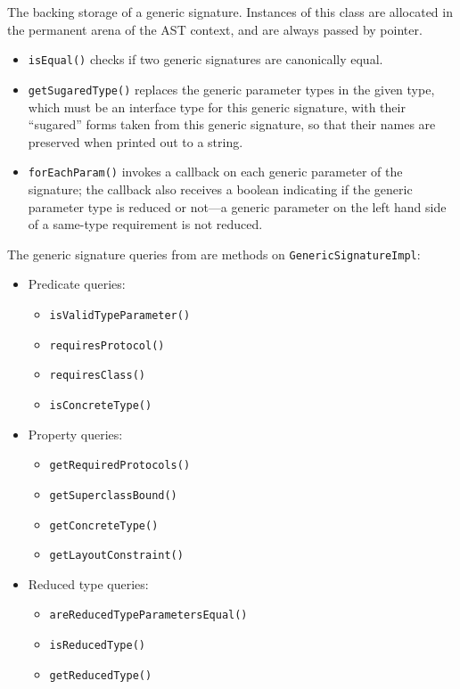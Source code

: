 \documentclass[../generics]{subfiles}
\begin{document}
The backing storage of a generic signature. Instances of this class are allocated in the permanent arena of the AST context, and are always passed by pointer.
\begin{itemize}
\item \texttt{isEqual()} checks if two generic signatures are canonically equal.
\item {}\texttt{getSugaredType()} replaces the generic parameter types in the given type, which must be an interface type for this generic signature, with their ``sugared'' forms taken from this generic signature, so that their names are preserved when printed out to a string.
\item \texttt{forEachParam()} invokes a callback on each generic parameter of the signature; the callback also receives a boolean indicating if the generic parameter type is reduced or not---a generic parameter on the left hand side of a same-type requirement is not reduced.
\end{itemize}
The generic signature queries from  are methods on \texttt{GenericSignatureImpl}:
\begin{itemize}
\item Predicate queries:
\begin{itemize}
\item {}\texttt{isValidTypeParameter()}
\item {}\texttt{requiresProtocol()}
\item {}\texttt{requiresClass()}
\item {}\texttt{isConcreteType()}
\end{itemize}
\item Property queries:
\begin{itemize}
\item {}\texttt{getRequiredProtocols()}
\item {}\texttt{getSuperclassBound()}
\item {}\texttt{getConcreteType()}
\item {}\texttt{getLayoutConstraint()}
\end{itemize}
\item Reduced type queries:
\begin{itemize}
\item {}\texttt{areReducedTypeParametersEqual()}
\item {}\texttt{isReducedType()}
\item {}\texttt{getReducedType()}
\end{itemize}
\end{itemize}
\end{document}
